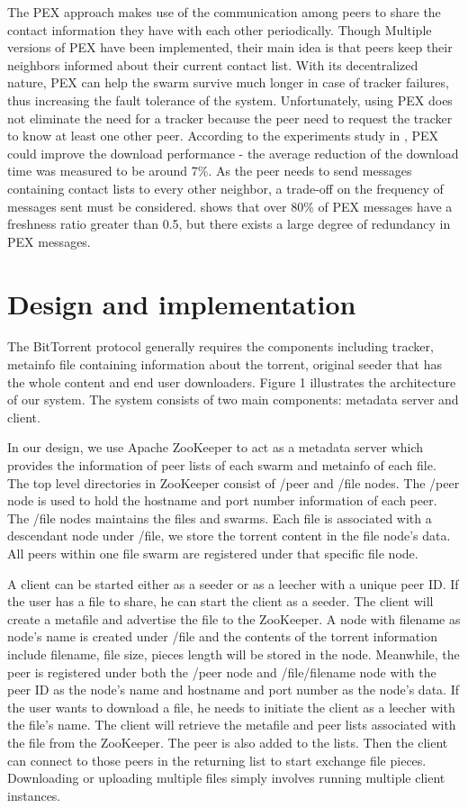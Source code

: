 \documentclass[conference]{IEEEtran}
\begin{document}
	The PEX approach makes use of the communication among peers to share the contact information they have with each other periodically. Though Multiple versions of PEX have been implemented, their main idea is that peers keep their neighbors informed about their current contact list. With its decentralized nature, PEX can help the swarm survive much longer in case of tracker failures, thus increasing the fault tolerance of the system. Unfortunately, using PEX does not eliminate the need for a tracker because the peer need to request the tracker to know at least one other peer. According to the experiments study in \cite{PEX}, PEX could improve the download performance - the average reduction of the download time was measured to be around 7\%. As the peer needs to send messages containing contact lists to every other neighbor, a trade-off on the frequency of messages sent must be considered. \cite{PEX} shows that over 80\% of PEX messages have a freshness ratio greater than 0.5, but there exists a large degree of redundancy in PEX messages.
	
	
	
	
	\section{Design and implementation}
	The BitTorrent protocol generally requires the components including tracker, metainfo file containing information about the torrent, original seeder that has the whole content and end user downloaders. Figure 1 illustrates the architecture of our system. The system consists of two main components: metadata server and client. 
	
	In our design, we use Apache ZooKeeper to act as a metadata server which provides the information of peer lists of each swarm and metainfo of each file. The top level directories in ZooKeeper consist of /peer and /file nodes. The /peer node is used to hold the hostname and port number information of each peer. The /file nodes maintains the files and swarms.  Each file is associated with a descendant node under /file, we store the  torrent content in the file node’s data. All peers within one file swarm are registered under that specific file node.
	
	A client can be started either as a seeder or as a leecher with a unique peer ID. If the user has a file to share, he can start the client as a seeder. The client will create a metafile and advertise the file to the ZooKeeper. A node with filename as node’s name is created under /file and the contents of the torrent information include filename, file size,  pieces length will be stored in the node. Meanwhile, the peer is registered under both the /peer node and /file/filename node with the peer ID as the node’s name and hostname and port number as the node’s data. If the user wants to download a file, he needs to initiate the client as a leecher with the file’s name. The client will retrieve the metafile and peer lists associated with the file from the ZooKeeper. The peer is also added to the lists. Then the client can connect to those peers in the returning list to start exchange file pieces. Downloading or uploading multiple files simply involves running multiple client instances.
	
\end{document}

